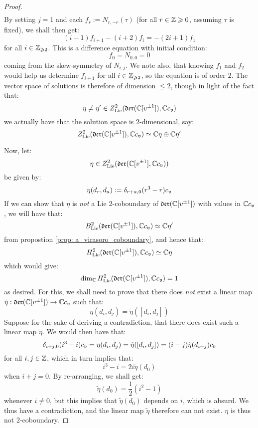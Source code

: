 \begin{proof}
$$\begin{aligned}
                    \end{aligned}
                $$
            By setting $j = 1$ and each $f_r := N_{r, -r}(\tau)$ (for all $r \in \mathbb{Z} \geqslant 0$, assuming $\tau$ is fixed), we shall then get:
                $$(i - 1) f_{i + 1} - (i + 2) f_i = -(2i + 1) f_1$$
            for all $i \in \mathbb{Z}_{\geqslant 2}$. This is a difference equation with initial condition:
                $$f_0 = N_{0, 0} = 0$$
            coming from the skew-symmetry of $N_{i, j}$. We note also, that knowing $f_1$ and $f_2$ would help us determine $f_{i + 1}$ for all $i \in \mathbb{Z}_{\geqslant 2}$, so the equation is of order $2$. The vector space of solutions is therefore of dimension $\leq 2$, though in light of the fact that:
                $$\eta \not = \eta' \in Z^2_{\mathrm{Lie}}(\mathfrak{der}(\mathbb{C}[v^{\pm 1}]), \mathbb{C} c_{\mathfrak{v}})$$
            we actually have that the solution space is $2$-dimensional, say:
                $$Z^2_{\mathrm{Lie}}(\mathfrak{der}(\mathbb{C}[v^{\pm 1}]), \mathbb{C} c_{\mathfrak{v}}) \simeq \mathbb{C} \eta \oplus \mathbb{C} \eta'$$

            Now, let:
                $$\eta \in Z^2_{\mathrm{Lie}}(\mathfrak{der}(\mathbb{C}[v^{\pm 1}], \mathbb{C} c_{\mathfrak{v}}))$$
            be given by:
                $$\eta(d_r, d_a) := \delta_{r + a, 0} (r^3 - r) c_{\mathfrak{v}}$$
            If we can show that $\eta$ is \textit{not} a Lie $2$-coboundary of $\mathfrak{der}(\mathbb{C}[v^{\pm 1}])$ with values in $\mathbb{C} c_{\mathfrak{v}}$, we will have that:
                $$B^2_{\mathrm{Lie}}(\mathfrak{der}(\mathbb{C}[v^{\pm 1}]), \mathbb{C} c_{\mathfrak{v}}) \simeq \mathbb{C} \eta'$$
            from propostion \ref{prop: a_virasoro_coboundary}, and hence that:
                $$H^2_{\mathrm{Lie}}(\mathfrak{der}(\mathbb{C}[v^{\pm 1}]), \mathbb{C} c_{\mathfrak{v}}) \simeq \mathbb{C} \eta$$
            which would give:
                $$\dim_{\mathbb{C}} H^2_{\mathrm{Lie}}(\mathfrak{der}(\mathbb{C}[v^{\pm 1}]), \mathbb{C} c_{\mathfrak{v}}) = 1$$
            as desired. For this, we shall need to prove that there does \textit{not} exist a linear map $\tilde{\eta}: \mathfrak{der}(\mathbb{C}[v^{\pm 1}]) \to \mathbb{C} c_{\mathfrak{v}}$ such that:
                $$\eta(d_i, d_j) = \tilde{\eta}([d_i, d_j])$$
            Suppose for the sake of deriving a contradiction, that there does exist such a linear map $\tilde{\eta}$. We would then have that:
                $$\delta_{i + j, 0} (i^3 - i) c_{\mathfrak{v}} = \eta(d_i, d_j) = \tilde{\eta}([d_i, d_j]) = (i - j) \tilde{\eta}(d_{i + j}) c_{\mathfrak{v}}$$
            for all $i, j \in \mathbb{Z}$, which in turn implies that:
                $$i^3 - i = 2i \tilde{\eta}(d_0)$$
            when $i + j = 0$. By re-arranging, we shall get:
                $$\tilde{\eta}(d_0) = \frac12(i^2 - 1)$$
            whenever $i \not = 0$, but this implies that $\tilde{\eta}(d_0)$ depends on $i$, which is absurd. We thus have a contradiction, and the linear map $\tilde{\eta}$ therefore can not exist. $\eta$ is thus not $2$-coboundary.
        \end{proof}
    
    \printbibliography

